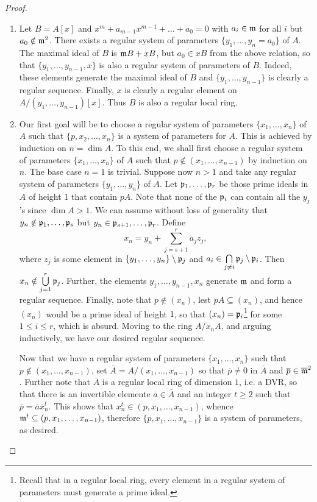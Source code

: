 \begin{proof}
\begin{enumerate}[label=(\arabic*)]
    \item Let $B = A[x]$ and $x^m + a_{m - 1}x^{m - 1} + \dots + a_0 = 0$ with $a_i\in\mathfrak{m}$ for all $i$ but $a_0\notin\mathfrak{m}^2$. There exists a regular system of parameters $\{y_1,\dots, y_n = a_0\}$ of $A$. The maximal ideal of $B$ is $\mathfrak{m} B + xB$, but $a_0\in xB$ from the above relation, so that $\{y_1,\dots, y_{n - 1}, x\}$ is also a regular system of parameters of $B$. Indeed, these elements generate the maximal ideal of $B$ and $\{y_1,\dots, y_{n - 1}\}$ is clearly a regular sequence. Finally, $x$ is clearly a regular element on $A/(y_1,\dots, y_{n - 1})[x]$. Thus $B$ is also a regular local ring.

    \item Our first goal will be to choose a regular system of parameters $\{x_1,\dots,x_n\}$ of $A$ such that $\{p, x_2,\dots, x_n\}$ is a system of parameters for $A$. This is achieved by induction on $n = \dim A$. To this end, we shall first choose a regular system of parameters $\{x_1,\dots,x_n\}$ of $A$ such that $p\notin (x_1,\dots,x_{n - 1})$ by induction on $n$. The base case $n = 1$ is trivial. Suppose now $n > 1$ and take any regular system of parameters $\{y_1,\dots,y_n\}$ of $A$. Let $\mathfrak{p}_1,\dots,\mathfrak{p}_r$ be those prime ideals in $A$ of height $1$ that contain $pA$. Note that none of the $\mathfrak{p}_i$ can contain all the $y_j$'s since $\dim A > 1$. We can assume without loss of generality that $y_n\notin\mathfrak{p}_1,\dots,\mathfrak{p}_s$ but $y_n\in\mathfrak{p}_{s + 1},\dots,\mathfrak{p}_r$. Define 
    \begin{equation*}
        x_n = y_n + \sum_{j = s + 1}^r a_j z_j,
    \end{equation*}
    where $z_j$ is some element in $\{y_1,\dots,y_n\}\setminus\mathfrak{p}_j$ and $a_i\in\bigcap\limits_{j\ne i}\mathfrak{p}_j\setminus\mathfrak{p}_i$. Then $x_n\notin\bigcup\limits_{j = 1}^r\mathfrak{p}_j$. Further, the elements $y_1,\dots,y_{n - 1}, x_n$ generate $\mathfrak{m}$ and form a regular sequence. Finally, note that $p\notin(x_n)$, lest $pA\subseteq (x_n)$, and hence $(x_n)$ would be a prime ideal of height $1$, so that $(x_n) = \mathfrak{p}_i$\footnote{Recall that in a regular local ring, every element in a regular system of parameters must generate a prime ideal.} for some $1\le i\le r$, which is absurd. Moving to the ring $A/x_n A$, and arguing inductively, we have our desired regular sequence. 

    Now that we have a regular system of parameters $\{x_1,\dots,x_n\}$ such that $p\notin (x_1,\dots,x_{n - 1})$, set $\overline A = A/(x_1,\dots,x_{n - 1})$ so that $\overline p\ne 0$ in $\overline A$ and $\overline p\in\overline{\mathfrak{m}}^2$. Further note that $\overline A$ is a regular local ring of dimension $1$, i.e. a DVR, so that there is an invertible elemente $\overline a\in\overline A$ and an integer $t\ge 2$ such that $\overline{p} = \overline a\overline x_n^t$. This shows that $x_n^t\in (p,x_1,\dots,x_{n - 1})$, whence $\mathfrak{m}^t\subseteq(p,x_1,\dots,x_{n - 1})$, therefore $\{p,x_1,\dots,x_{n - 1}\}$ is a system of parameters, as desired.


\end{enumerate}
\end{proof}
